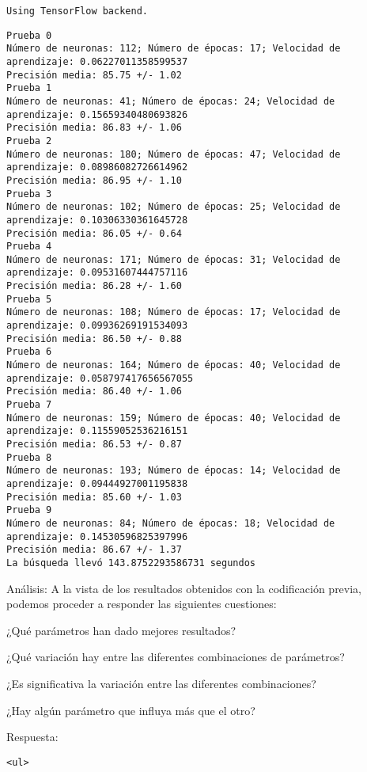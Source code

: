 \documentclass[11pt]{article}
\begin{document}
    \begin{Verbatim}[commandchars=\\\{\}]
Using TensorFlow backend.

    \end{Verbatim}

    \begin{Verbatim}[commandchars=\\\{\}]
Prueba 0
Número de neuronas: 112; Número de épocas: 17; Velocidad de aprendizaje: 0.06227011358599537
Precisión media: 85.75 +/- 1.02
Prueba 1
Número de neuronas: 41; Número de épocas: 24; Velocidad de aprendizaje: 0.15659340480693826
Precisión media: 86.83 +/- 1.06
Prueba 2
Número de neuronas: 180; Número de épocas: 47; Velocidad de aprendizaje: 0.08986082726614962
Precisión media: 86.95 +/- 1.10
Prueba 3
Número de neuronas: 102; Número de épocas: 25; Velocidad de aprendizaje: 0.10306330361645728
Precisión media: 86.05 +/- 0.64
Prueba 4
Número de neuronas: 171; Número de épocas: 31; Velocidad de aprendizaje: 0.09531607444757116
Precisión media: 86.28 +/- 1.60
Prueba 5
Número de neuronas: 108; Número de épocas: 17; Velocidad de aprendizaje: 0.09936269191534093
Precisión media: 86.50 +/- 0.88
Prueba 6
Número de neuronas: 164; Número de épocas: 40; Velocidad de aprendizaje: 0.058797417656567055
Precisión media: 86.40 +/- 1.06
Prueba 7
Número de neuronas: 159; Número de épocas: 40; Velocidad de aprendizaje: 0.11559052536216151
Precisión media: 86.53 +/- 0.87
Prueba 8
Número de neuronas: 193; Número de épocas: 14; Velocidad de aprendizaje: 0.09444927001195838
Precisión media: 85.60 +/- 1.03
Prueba 9
Número de neuronas: 84; Número de épocas: 18; Velocidad de aprendizaje: 0.14530596825397996
Precisión media: 86.67 +/- 1.37
La búsqueda llevó 143.8752293586731 segundos

    \end{Verbatim}

    Análisis: A la vista de los resultados obtenidos con la codificación
previa, podemos proceder a responder las siguientes cuestiones:

¿Qué parámetros han dado mejores resultados?

¿Qué variación hay entre las diferentes combinaciones de parámetros?

¿Es significativa la variación entre las diferentes combinaciones?

¿Hay algún parámetro que influya más que el otro?

    Respuesta:

\begin{verbatim}
<ul>
\end{verbatim}
\end{document}
